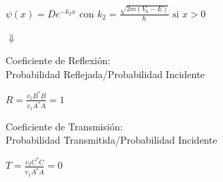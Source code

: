 \documentclass[oneside]{book}
\numberwithin{equation}{section}
\numberwithin{figure}{section}
\numberwithin{table}{section}
\begin{document}
\begin{minipage}[t]{0.5\textwidth}
\begin{center}
						$\displaystyle \psi(x)=De^{-k_2x} \text{ con } k_2=\frac{\sqrt{2m(V_0-E)}}{\hbar} \text{ si } x>0$
					\end{center}
					\begin{center}
						$\Downarrow$
					\end{center}
					\begin{center}
						Coeficiente de Reflexión:\\
						Probabilidad Reflejada/Probabilidad Incidente
					\end{center}
					 \begin{center}
						$\displaystyle R=\frac{v_1B^*B}{v_1A^*A}=1$
					\end{center}
					 \begin{center}
						Coeficiente de Transmisión:\\
						Probabilidad Transmitida/Probabilidad Incidente
					\end{center}
					 \begin{center}
						$\displaystyle T=\frac{v_2C^*C}{v_1A^*A}=0$
					\end{center}
				\end{minipage}
\end{document}
